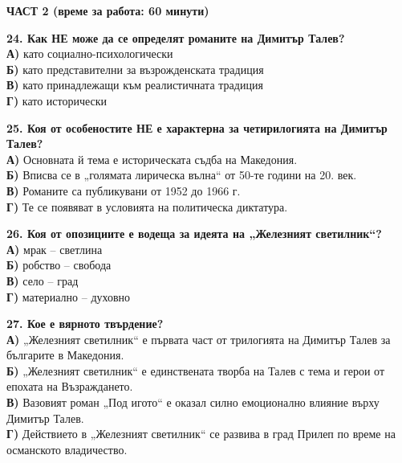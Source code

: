 \documentclass[12pt,a4paper]{article}
\begin{document}
\noindent
\textbf{ЧАСТ 2 (време за работа: 60 минути)}

\vspace{0.3cm}

\noindent
\textbf{24. Как НЕ може да се определят романите на Димитър Талев?} \\
\noindent
\textbf{А)} като социално-психологически \\
\textbf{Б)} като представителни за възрожденската традиция \\
\textbf{В)} като принадлежащи към реалистичната традиция \\
\textbf{Г)} като исторически

\vspace{0.6cm}

\noindent
\textbf{25. Коя от особеностите НЕ е характерна за четирилогията на Димитър Талев?} \\
\noindent
\textbf{А)} Основната й тема е историческата съдба на Македония. \\
\textbf{Б)} Вписва се в „голямата лирическа вълна“ от 50-те години на 20. век. \\
\textbf{В)} Романите са публикувани от 1952 до 1966 г. \\
\textbf{Г)} Те се появяват в условията на политическа диктатура.

\vspace{0.6cm}

\noindent
\textbf{26. Коя от опозициите е водеща за идеята на „Железният светилник“?} \\
\noindent
\textbf{А)} мрак -- светлина \\
\textbf{Б)} робство -- свобода \\
\textbf{В)} село -- град \\
\textbf{Г)} материално -- духовно

\vspace{0.6cm}

\noindent
\textbf{27. Кое е вярното твърдение?} \\
\noindent
\textbf{А)} „Железният светилник“ е първата част от трилогията на Димитър Талев за българите в Македония. \\
\textbf{Б)} „Железният светилник“ е единствената творба на Талев с тема и герои от епохата на Възраждането. \\
\textbf{В)} Вазовият роман „Под игото“ е оказал силно емоционално влияние върху Димитър Талев. \\
\textbf{Г)} Действието в „Железният светилник“ се развива в град Прилеп по време на османското владичество.
\end{document}
